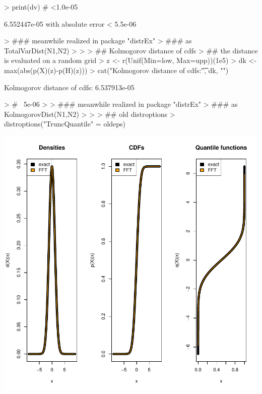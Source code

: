 \documentclass[11pt]{article}
\begin{document}
\begin{Schunk}
\begin{Soutput}
\end{Soutput}
\begin{Sinput}
> print(dv) # <1.0e-05
\end{Sinput}
\begin{Soutput}
6.552447e-05 with absolute error < 5.5e-06
\end{Soutput}
\begin{Sinput}
> ### meanwhile realized in package "distrEx" 
> ### as TotalVarDist(N1,N2)
> 
> 
> ## Kolmogorov distance of cdfs 
> ## the distance is evaluated on a random grid
> z <- r(Unif(Min=low, Max=upp))(1e5)
> dk <- max(abs(p(X)(z)-p(H)(z)))
> cat("Kolmogorov distance of cdfs:\t", dk, "\n") 
\end{Sinput}
\begin{Soutput}
Kolmogorov distance of cdfs:	 6.537913e-05 
\end{Soutput}
\begin{Sinput}
> # ~5e-06
> 
> ### meanwhile realized in package "distrEx" 
> ### as KolmogorovDist(N1,N2)
> 
> 
> ## old distroptions
> distroptions("TruncQuantile" = oldeps)
\end{Sinput}
\end{Schunk}
\includegraphics{distr-StationaryRegressorDistr}
\end{document}
